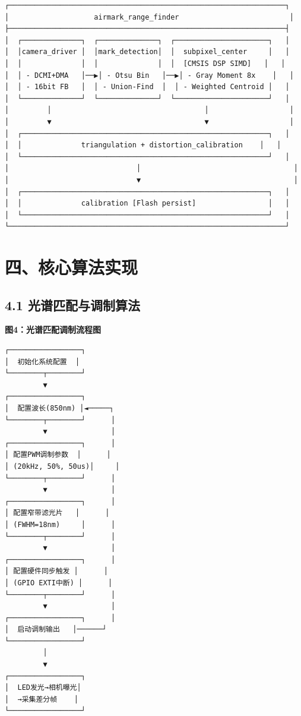 \documentclass[12pt,a4paper]{article}
\begin{document}
\begin{verbatim}
┌─────────────────────────────────────────────────────────────────┐
│                    airmark_range_finder                          │
├─────────────────────────────────────────────────────────────────┤
│  ┌──────────────┐  ┌──────────────┐  ┌──────────────────────┐   │
│  │camera_driver │  │mark_detection│  │  subpixel_center     │   │
│  │              │  │              │  │  [CMSIS DSP SIMD]   │   │
│  │ - DCMI+DMA   │──▶│ - Otsu Bin   │──▶│ - Gray Moment 8x    │   │
│  │ - 16bit FB   │  │ - Union-Find  │  │ - Weighted Centroid │   │
│  └──────────────┘  └──────────────┘  └──────────────────────┘   │
│         │                                    │                   │
│         ▼                                    ▼                   │
│  ┌──────────────────────────────────────────────────────────┐   │
│  │              triangulation + distortion_calibration    │   │
│  └──────────────────────────────────────────────────────────┘   │
│                              │                                    │
│                              ▼                                    │
│  ┌──────────────────────────────────────────────────────────┐   │
│  │              calibration [Flash persist]                 │   │
│  └──────────────────────────────────────────────────────────┘   │
└─────────────────────────────────────────────────────────────────┘
\end{verbatim}

\newpage

\section{四、核心算法实现}

\subsection{4.1 光谱匹配与调制算法}

\textbf{图4：光谱匹配调制流程图}

\begin{verbatim}
┌─────────────────┐
│  初始化系统配置  │
└────────┬────────┘
         ▼
┌─────────────────┐
│  配置波长(850nm) │◄─────┐
└────────┬────────┘      │
         ▼               │
┌─────────────────┐      │
│ 配置PWM调制参数  │      │
│ (20kHz, 50%, 50us)│     │
└────────┬────────┘      │
         ▼               │
┌─────────────────┐      │
│ 配置窄带滤光片   │      │
│ (FWHM=18nm)     │      │
└────────┬────────┘      │
         ▼               │
┌─────────────────┐      │
│ 配置硬件同步触发 │      │
│ (GPIO EXTI中断) │      │
└────────┬────────┘      │
         ▼               │
┌─────────────────┐      │
│  启动调制输出   │──────┘
└─────────────────┘
         │
         ▼
┌─────────────────┐
│  LED发光→相机曝光│
│  →采集差分帧    │
└─────────────────┘
\end{verbatim}
\end{document}
